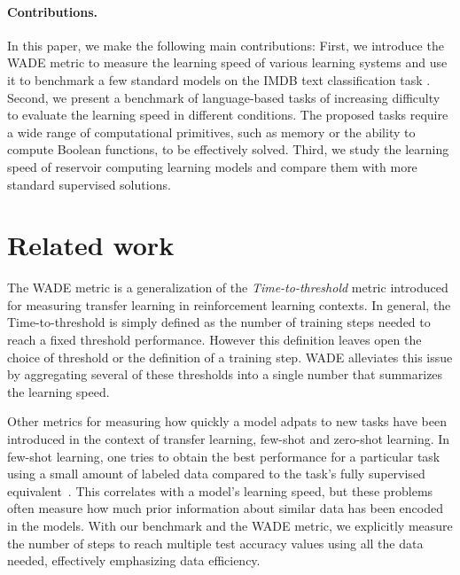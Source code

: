 \paragraph{Contributions.} In this paper, we make the following main contributions: First, we introduce the
\acf{WADE} metric to measure the learning speed of various learning systems and use it to benchmark a few standard models on the IMDB text
classification task \cite{maasLearningWordVectors2011}.
Second, we present a benchmark of language-based tasks of increasing difficulty
to evaluate the learning speed in different conditions. The proposed tasks require a wide range of computational primitives, such as memory or the ability to compute Boolean functions, to be effectively solved.  Third, we study the
learning speed of reservoir computing learning models
and compare them with more standard supervised solutions.
\vspace{-8pt}
\section{Related work}
The \ac{WADE} metric is a generalization of the \emph{Time-to-threshold} metric
\cite{taylorCrossdomainTransferReinforcement2007,
  taylorTransferLearningInterTask2007} introduced for measuring transfer
learning in reinforcement learning contexts. In general, the Time-to-threshold
is simply defined as the number of training steps needed to reach a fixed
threshold performance. However this definition leaves open the choice of
threshold or the definition of a training step. \ac{WADE} alleviates this issue
by aggregating several of these thresholds into a single number that summarizes
the learning speed.

Other metrics for measuring how quickly a model adpats to new tasks have been
introduced in the context of transfer learning, few-shot and zero-shot learning.
In few-shot learning, one tries to obtain the best performance for a particular
task using a small amount of labeled data compared to the task's fully
supervised equivalent~\cite{wangGeneralizingFewExamples2020}. This correlates
with a model's learning speed, but these problems often measure how much prior
information about similar data has been encoded in the models. With our
benchmark and the \ac{WADE} metric, we explicitly measure the number of steps to reach
multiple test accuracy values using all the data needed, effectively emphasizing
data efficiency.

